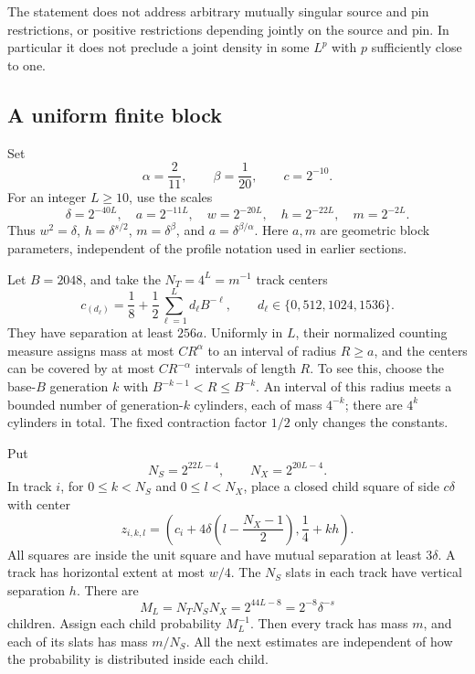 The statement does not address arbitrary mutually singular source and
pin restrictions, or positive restrictions depending jointly on the
source and pin. In particular it does not preclude a joint density in
some \(L^p\) with \(p\) sufficiently close to one.

\subsection{A uniform finite block}

Set
\[
 \alpha=\frac2{11},\qquad \beta=\frac1{20},\qquad c=2^{-10}.
\]
For an integer \(L\ge10\), use the scales
\begin{equation}\label{sourceobs:scales}
 \delta=2^{-40L},\quad a=2^{-11L},\quad
 w=2^{-20L},\quad h=2^{-22L},\quad m=2^{-2L}.
\end{equation}
Thus \(w^2=\delta\), \(h=\delta^{s/2}\),
\(m=\delta^\beta\), and \(a=\delta^{\beta/\alpha}\).
Here \(a,m\) are geometric block parameters, independent of the
profile notation used in earlier sections.

Let \(B=2048\), and take the \(N_T=4^L=m^{-1}\) track centers
\[
 c_{(d_\ell)}
 =\frac18+\frac12\sum_{\ell=1}^L d_\ell B^{-\ell},
 \qquad d_\ell\in\{0,512,1024,1536\}.
\]
They have separation at least \(256a\). Uniformly in \(L\), their
normalized counting measure assigns mass at most \(CR^\alpha\) to
an interval of radius \(R\ge a\), and the centers can be covered by
at most \(CR^{-\alpha}\) intervals of length \(R\). To see this,
choose the base-\(B\) generation \(k\) with
\(B^{-k-1}<R\le B^{-k}\). An interval of this radius meets a
bounded number of generation-\(k\) cylinders, each of mass \(4^{-k}\);
there are \(4^k\) cylinders in total. The fixed contraction factor
\(1/2\) only changes the constants.

Put
\[
 N_S=2^{22L-4},\qquad N_X=2^{20L-4}.
\]
In track \(i\), for \(0\le k<N_S\) and \(0\le l<N_X\), place a
closed child square of side \(c\delta\) with center
\[
 z_{i,k,l}=
 \left(c_i+4\delta\left(l-\frac{N_X-1}{2}\right),
                  \frac14+kh\right).
\]
All squares are inside the unit square and have mutual separation
at least \(3\delta\). A track has horizontal extent at most \(w/4\).
The \(N_S\) slats in each track have vertical separation \(h\).
There are
\begin{equation}\label{sourceobs:branching}
 M_L=N_TN_SN_X=2^{44L-8}=2^{-8}\delta^{-s}
\end{equation}
children. Assign each child probability \(M_L^{-1}\). Then every
track has mass \(m\), and each of its slats has mass \(m/N_S\).
All the next estimates are independent of how the probability is
distributed inside each child.

